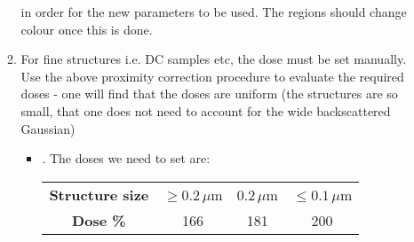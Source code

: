 \begin{itemize}
\begin{enumerate}
\begin{itemize}
     \end{itemize}
       in
     order  for the  new parameters  to  be used.  The regions  should
     change colour once this is done.
   \item For fine structures i.e. DC samples etc, the dose must be set
     manually.  Use  the  above   proximity  correction  procedure  to
     evaluate the  required doses - one  will find that the  doses are
     uniform (the structures  are so small, that one does  not need to
     account for the wide backscattered Gaussian)
     \begin{itemize}
     \item   {}. The doses we need to set are:

       \begin{center}
         \begin{tabular}{|c|c|c|c|}
           \textbf{Structure size} & $ \ge 0.2\,\mu $m & $ 0.2\,\mu $m & $ \le 0.1\,\mu $m\\
           \textbf{Dose \%} & 166 & 181 & 200
         \end{tabular}
       \end{center}
     \end{itemize}
   \end{enumerate}
 \end{itemize}

